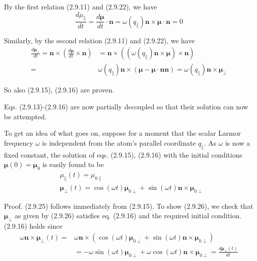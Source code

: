 \documentclass{article}
\begin{document}
By the first relation (2.9.11) and (2.9.22), we have
$$
\begin{equation*}
\frac{d \mu_{\|}}{d t}=\frac{d \boldsymbol{\mu}}{d t} \cdot \boldsymbol{n}=\omega\left(q_{\|}\right) \boldsymbol{n} \times \boldsymbol{\mu} \cdot \boldsymbol{n}=0 \tag{2.9.23}
\end{equation*}
$$

Similarly, by the second relation (2.9.11) and (2.9.22), we have
$$
\begin{align*}
\frac{d \boldsymbol{\mu}_{\perp}}{d t}=\boldsymbol{n} \times\left(\frac{d \boldsymbol{\mu}}{d t} \times \boldsymbol{n}\right) & =\boldsymbol{n} \times\left(\left(\omega\left(q_{\|}\right) \boldsymbol{n} \times \boldsymbol{\mu}\right) \times \boldsymbol{n}\right)  \tag{2.9.24}\\
= & \omega\left(q_{\|}\right) \boldsymbol{n} \times(\boldsymbol{\mu}-\boldsymbol{\mu} \cdot \boldsymbol{n} \boldsymbol{n})=\omega\left(q_{\|}\right) \boldsymbol{n} \times \boldsymbol{\mu}_{\perp}
\end{align*}
$$

So also (2.9.15), (2.9.16) are proven.

Eqs. (2.9.13)-(2.9.16) are now partially decoupled so that their solution can now be attempted.

To get an idea of what goes on, suppose for a moment that the scalar Larmor frequency $\omega$ is independent from the atom's parallel coordinate $q_{\|}$. As $\omega$ is now a fixed constant, the solution of eqs. (2.9.15), (2.9.16) with the initial conditions $\boldsymbol{\mu}(0)=\boldsymbol{\mu}_{0}$ is easily found to be
$$
\begin{align*}
& \mu_{\|}(t)=\mu_{0 \|}  \tag{2.9.25}\\
& \boldsymbol{\mu}_{\perp}(t)=\cos (\omega t) \boldsymbol{\mu}_{0 \perp}+\sin (\omega t) \boldsymbol{n} \times \boldsymbol{\mu}_{0 \perp} \tag{2.9.26}
\end{align*}
$$

Proof. (2.9.25) follows immediately from (2.9.15).
To show (2.9.26), we check that $\boldsymbol{\mu}_{\perp}$ as given by (2.9.26) satisfies eq. (2.9.16) and the required initial condition. (2.9.16) holds since
$$
\begin{align*}
\omega \boldsymbol{n} \times \boldsymbol{\mu}_{\perp}(t)= & \omega \boldsymbol{n} \times\left(\cos (\omega t) \boldsymbol{\mu}_{0 \perp}+\sin (\omega t) \boldsymbol{n} \times \boldsymbol{\mu}_{0 \perp}\right)  \tag{2.9.27}\\
& =-\omega \sin (\omega t) \boldsymbol{\mu}_{0 \perp}+\omega \cos (\omega t) \boldsymbol{n} \times \boldsymbol{\mu}_{0 \perp}=\frac{d \boldsymbol{\mu}_{\perp}(t)}{d t}
\end{align*}
$$
\end{document}
